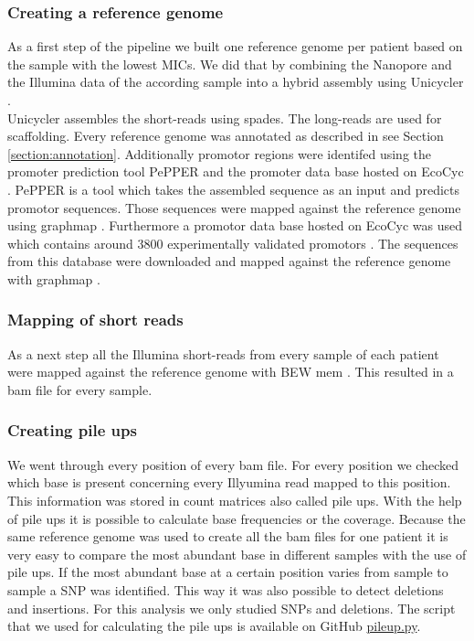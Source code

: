 \subsubsection{Creating a reference genome}
As a first step of the pipeline we built one reference genome per patient based on the sample with the lowest MICs. We did that by combining the Nanopore and the Illumina data of the according sample into a hybrid assembly using Unicycler \cite{wick_unicycler:_2017}. \\
Unicycler assembles the short-reads using spades. The long-reads are used for scaffolding.
Every reference genome was annotated as described in see Section \ref{section:annotation}. Additionally promotor regions were identifed using the promoter prediction tool PePPER \cite{pepper} and the promoter data base hosted on EcoCyc \cite{ecocyc}. PePPER is a tool which takes the assembled sequence as an input and predicts promotor sequences. Those sequences were mapped against the reference genome using graphmap \cite{sovic_fast_2016}. Furthermore a promotor data base hosted on EcoCyc was used which contains around 3800 experimentally validated promotors \cite{noauthor_smarttable_nodate}. The sequences from this database were downloaded and mapped against the reference genome with graphmap \cite{sovic_fast_2016}. 
\label{section:annotatiion_ref}

\subsubsection{Mapping of short reads}
As a next step all the Illumina short-reads from every sample of each patient were mapped against the reference genome with BEW mem \cite{li_fast_2009}. This resulted in a bam file for every sample.

\subsubsection{Creating pile ups}
We went through every position of every bam file. For every position we checked which base is present concerning every Illyumina read mapped to this position. This information was stored in count matrices also called pile ups. With the help of pile ups it is possible to calculate base frequencies or the coverage. Because the same reference genome was used to create all the bam files for one patient it is very easy to compare the most abundant base in different samples with the use of pile ups. If the most abundant base at a certain position varies from sample to sample a SNP was identified. This way it was also possible to detect deletions and insertions. For this analysis we only studied SNPs and deletions. The script that we used for calculating the pile ups is available on GitHub \href{https://github.com/nahanoo/ESBL\_project/pileup.py}{pileup.py}.


